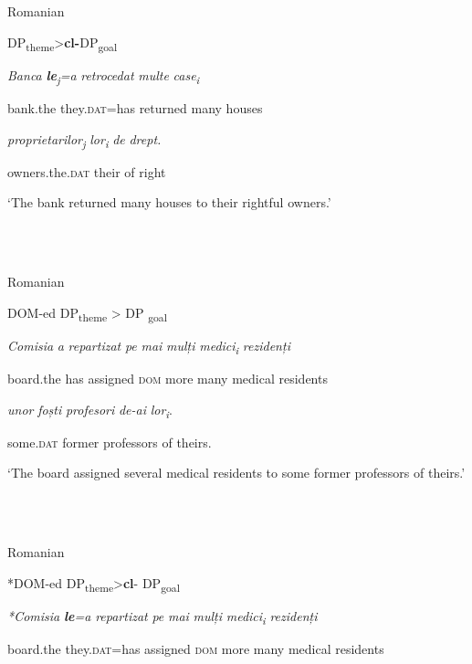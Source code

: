 \documentclass[output=paper,colorlinks,citecolor=brown]{./langscibook}
\begin{document}
\ea%
    \label{ex:key:2}
    \gll\\
        \\
    \glt
    \z

          Romanian \citet[162]{CornilescuDinuTigău2017DOC}

DP\textsubscript{theme}>\textbf{cl-}DP\textsubscript{goal}

\textit{Banca}    \textbf{\textit{le}}\textit{\textsubscript{j}}\textit{=a}     \textit{retrocedat}    \textit{multe} \textit{case\textsubscript{i}}

bank.the  they.\textsc{dat}=has   returned     many houses  

\textit{proprietarilor\textsubscript{j}}    \textit{lor\textsubscript{i}  }\textit{de} \textit{drept.}

owners.the.\textsc{dat}  their   of right

‘The bank returned many houses to their rightful owners.’

\ea%
    \label{ex:key:3}
    \gll\\
        \\
    \glt
    \z

          Romanian

DOM-ed DP\textsubscript{theme} > DP \textsubscript{goal}

\textit{Comisia}  \textit{a} \textit{repartizat}  \textit{pe} \textit{mai}    \textit{mulți}   \textit{medici\textsubscript{i}    }\textit{rezidenți}  

board.the  has assigned  \textsc{dom} more many medical residents  

\textit{unor}    \textit{foști} \textit{profesori}    \textit{de-ai} \textit{lor\textsubscript{i}}.

some.\textsc{dat}  former professors   of theirs.

‘The board assigned several medical residents to some former professors of theirs.’

\ea%
    \label{ex:key:4}
    \gll\\
        \\
    \glt
    \z

          Romanian

*DOM-ed DP\textsubscript{theme}>\textbf{cl}{}- DP\textsubscript{goal}

\textit{*Comisia}  \textbf{\textit{le}}\textit{=a}   \textit{repartizat}  \textit{pe}  \textit{mai} \textit{mulți} \textit{medici\textsubscript{i}  }\textit{rezidenți}

board.the  they.\textsc{dat}=has assigned  \textsc{dom} more many medical residents   
\end{document}
